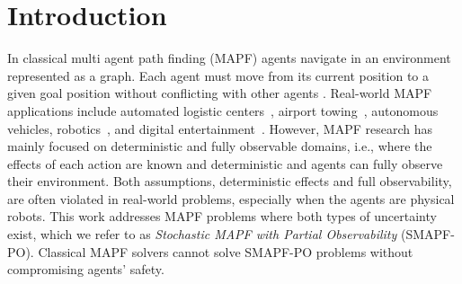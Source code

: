 \documentclass[letterpaper]{article} %
\newcommand{\plan}[1]{{\textcolor{blue}{[Plan: #1]}}}
\newcommand{\inon}[1]{ }
\begin{document}


\section{Introduction}

In classical multi agent path finding (MAPF) agents navigate in an environment represented as a graph.  Each agent must move from its current position to a given goal position without conflicting with other agents \cite{stern2019mapf}.
Real-world MAPF applications include automated logistic centers~\cite{wurman2008coordinating,salzman2020research}, airport towing~\cite{morris2016planning}, autonomous vehicles, robotics~\cite{veloso2015cobots}, and digital entertainment~\cite{ma2017feasibility}. However, MAPF research has mainly focused on deterministic and fully observable domains, i.e., where the effects of each action are known and deterministic and agents can fully observe their environment.
Both assumptions, deterministic effects and full observability, are often violated in real-world problems, especially when the agents are physical robots.
This work addresses MAPF problems where both types of uncertainty exist, which we refer to as \emph{Stochastic MAPF with Partial Observability} (SMAPF-PO).
Classical MAPF solvers cannot solve SMAPF-PO problems without compromising agents' safety.



\end{document}
